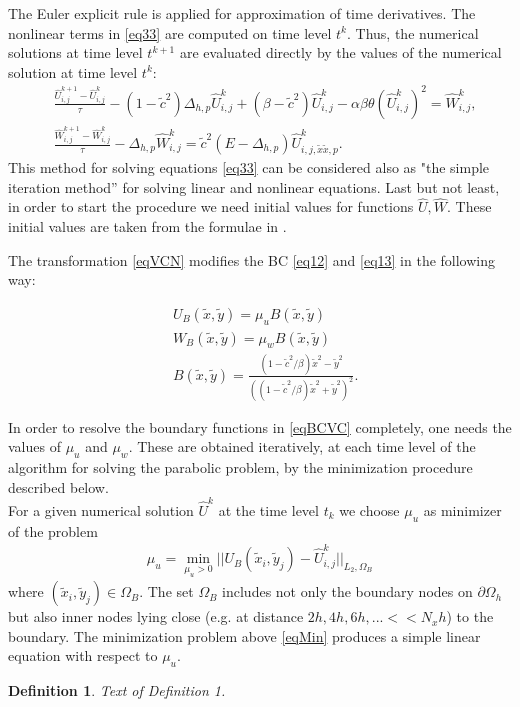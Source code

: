 \documentclass[12pt]{article}
\newcommand{\dO}{\partial\Omega_{h}}
\theoremstyle{theorem}
\theoremstyle{defi}
\newtheorem{definition}[theorem]{Definition}
\begin{document}
The Euler explicit rule is applied for approximation of  time derivatives. The nonlinear terms in \eqref{eq33} are computed on time level $t^k$. Thus, the numerical solutions at time level $t^{k+1}$ are evaluated directly by the values of the numerical solution at time level $t^k$:  
 \begin{equation}\label{eq34}
 \begin{split}
   &\frac {\widehat{U}_{i,j}^{k+1}-\widehat{U}_{i,j}^{k}}{\tau}- (1-\tilde c^2 ) \Delta_{h,p} \widehat{U} _{i,j}^{k}+  (\beta-\tilde c^2 ) \widehat{U}_{i,j}^{k} - \alpha \beta \theta (\widehat{U}_{i,j}^{k})^2 = \widehat{W}_{i,j}^{k}, \\
  &\frac  {\widehat{W}_{i,j}^{k+1} -\widehat{W}_{i,j}^{k}} {\tau} - \Delta_{h,p} \widehat{W}_{i,j}^{k} =  \tilde c^2 (E- \Delta_{h,p})       
    \widehat{U}_{i,j,{\tilde x \tilde x,p}}^{k}. 
\end{split}
\end{equation}
This method for solving equations 
\eqref{eq33} can be considered also as "the simple iteration method'' for solving linear and nonlinear equations.
Last but not least, in order to start the procedure we need initial values for functions $\widehat{U},\widehat{W}$. These initial values are taken from the formulae in \cite{ref10}.

The transformation \eqref{eqVCN} modifies the BC \eqref{eq12} and \eqref{eq13} in the following way:

\begin{equation}\label{eqBCVC}
\begin{split}
&U_B(\tilde{x} , \tilde y) = \mu_u B( \tilde x, \tilde y) \\
&W_B(\tilde{x} , \tilde y) = \mu_w B( \tilde x, \tilde y) \\
&B(\tilde{x} , \tilde y) = \frac{ (1 - \tilde c^2/ \beta) \tilde x^2 - \tilde y^2}{( (1 - \tilde c^2/ \beta) \tilde x^2 + \tilde y^2)^2}. 
\end{split}
\end{equation}

In order to resolve the boundary functions in \eqref{eqBCVC} completely, one needs the values of $\mu_u$  and $\mu_w$. These are obtained iteratively, at each time level of the algorithm for solving the parabolic problem, by the minimization procedure described below. 
\\
	For a given numerical solution $\widehat U ^k$  at the time level  $t_k$ we choose $\mu_u$  as minimizer of the problem
\begin{equation}\label{eqMin}
\begin{split}
\mu_u = \min_{ \mu_u > 0 } || U_B( \tilde x_i, \tilde y_j) - \widehat U ^k_{i,j} ||_{L_2,\Omega_B}
\end{split}
\end{equation}
where  $( \tilde x_i, \tilde y_j) \in \Omega_B$. The set $\Omega_B$ includes not only the boundary nodes on $\dO$ but also inner nodes lying close (e.g. at distance $2h, 4h, 6h, ... << N_x h $) to the boundary. The minimization problem above \eqref{eqMin} produces a simple linear equation with respect to $\mu_u$.
\begin{definition}
Text of Definition 1.
\end{definition}
\end{document}
